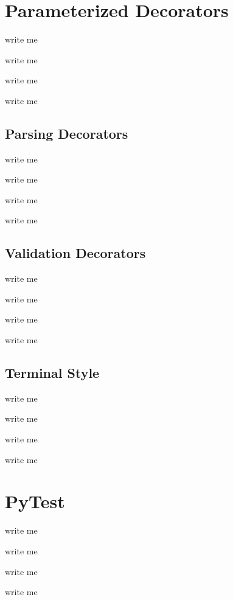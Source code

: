 \documentclass[letterpaper,10pt,english]{sphinxmanual}
\begin{document}
\section{Parameterized Decorators}
\label{\detokenize{Development Tools:parameterized-decorators}}
\begin{DUlineblock}{0em}
\item[] write me
\item[] write me
\item[] write me
\item[] write me
\end{DUlineblock}


\subsection{Parsing Decorators}
\label{\detokenize{Development Tools:parsing-decorators}}
\begin{DUlineblock}{0em}
\item[] write me
\item[] write me
\item[] write me
\item[] write me
\end{DUlineblock}


\subsection{Validation Decorators}
\label{\detokenize{Development Tools:validation-decorators}}
\begin{DUlineblock}{0em}
\item[] write me
\item[] write me
\item[] write me
\item[] write me
\end{DUlineblock}


\subsection{Terminal Style}
\label{\detokenize{Development Tools:terminal-style}}
\begin{DUlineblock}{0em}
\item[] write me
\item[] write me
\item[] write me
\item[] write me
\end{DUlineblock}


\section{PyTest}
\label{\detokenize{Development Tools:pytest}}
\begin{DUlineblock}{0em}
\item[] write me
\item[] write me
\item[] write me
\item[] write me
\end{DUlineblock}
\end{document}

